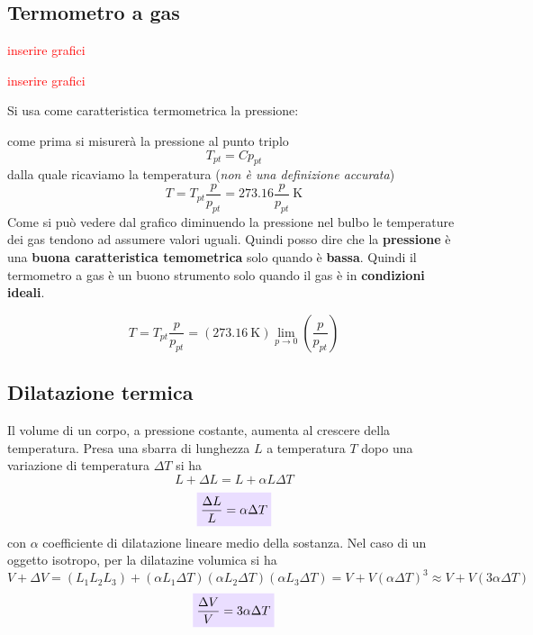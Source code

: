 \documentclass[x11names]{report}
\newcommand{\viola}[1]{\colorbox{yred}{$\displaystyle #1$}}
\begin{document}
	\subsection{Termometro a gas}
	\begin{center}
		\begin{minipage}{0.49\textwidth}
			\begin{center}
				\textcolor{red}{inserire grafici}
			\end{center}
		\end{minipage}
		\begin{minipage}{0.49\textwidth}
			\begin{center}
				\textcolor{red}{inserire grafici}
			\end{center}
		\end{minipage}
	\end{center}
	Si usa come caratteristica termometrica la pressione:
	
	come prima si misurerà la pressione al punto triplo
	\[ 
	T_{pt} = Cp_{pt}
	\]
	dalla quale ricaviamo la temperatura \colorbox{attenzione}{(\textit{non è una definizione accurata})}
	\[ 
	T = T_{pt}\frac{p}{p_{pt}} = 273.16\frac{p}{p_{pt}}\SI{}{\kelvin}
	\]
	Come si può vedere dal grafico diminuendo la pressione nel bulbo le temperature dei gas tendono ad assumere valori uguali. Quindi posso dire che la \textbf{pressione} è una \textbf{buona caratteristica temometrica} solo quando è \textbf{bassa}. Quindi il termometro a gas è un buono strumento solo quando il gas è in \textbf{condizioni ideali}.
	
	\[ 
	T = T_{pt}\frac{p}{p_{pt}} = \left(\SI{273.16}{\kelvin}\right)\lim_{p\to 0}\left(\frac{p}{p_{pt}}\right)
	\]
	
	\subsection{Dilatazione termica}
	Il volume di un corpo, a pressione costante, aumenta al crescere della temperatura. Presa una sbarra di lunghezza \(L\) a temperatura \(T\) dopo una variazione di temperatura \(\Delta T\) si ha
	\[ 
	L +\Delta L = L + \alpha L\Delta T
	\]
	\[ 
	\viola{\frac{\Delta L}{L} = \alpha \Delta T}
	\]
	con \(\alpha\) coefficiente di dilatazione lineare medio della sostanza. Nel caso di un oggetto isotropo, per la dilatazine volumica si ha
	\[ 
	V + \Delta V = \left(L_1L_2L_3\right) + \left(\alpha L_1 \Delta T\right)\left(\alpha L_2 \Delta T\right)\left(\alpha L_3 \Delta T\right) = V + V(\alpha \Delta T)^3 \approx V + V(3\alpha \Delta T)
	\]
	\[ 
	\viola{\frac{\Delta V}{V} = 3\alpha \Delta T}
	\]
	
\end{document}
